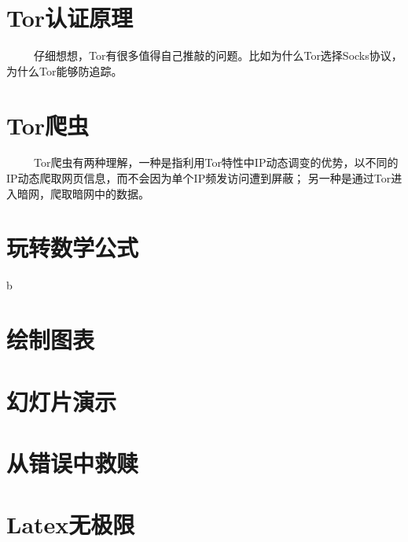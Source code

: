 \documentclass[12pt]{article}  %
\begin{document}
\section{Tor认证原理} %
\label{sec:组织你的文本}
\ \ \ \ \ 仔细想想，Tor有很多值得自己推敲的问题。比如为什么Tor选择Socks协议，为什么Tor能够防追踪。
\section{Tor爬虫} %
\label{sec:自动化工具}
\ \ \ \ \ Tor爬虫有两种理解，一种是指利用Tor特性中IP动态调变的优势，以不同的IP动态爬取网页信息，而不会因为单个IP频发访问遭到屏蔽；
另一种是通过Tor进入暗网，爬取暗网中的数据。
\section{玩转数学公式} %
\label{sec:玩转数学公式}
b
\section{绘制图表} %
\label{sec:绘制图表}
\section{幻灯片演示} %
\label{sec:幻灯片演示}
\section{从错误中救赎} %
\label{sec:从错误中救赎}
\section{Latex无极限} %
\label{sec:Latex无极限}

\end{document}
